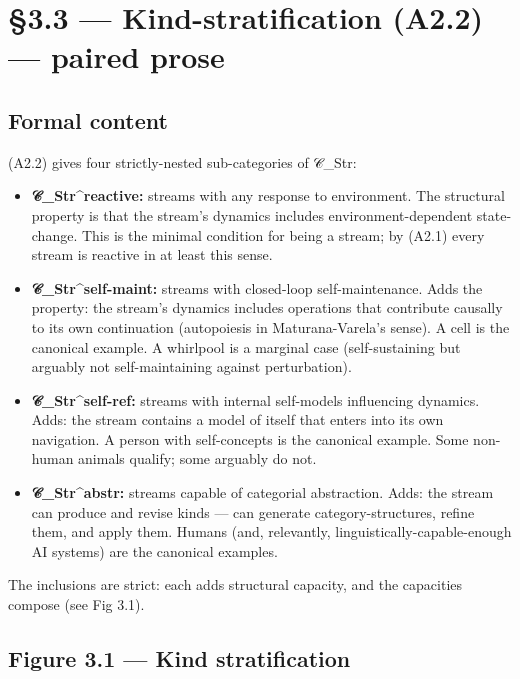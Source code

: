 \documentclass[11pt, openany]{book}
\newcommand{\sectionbreak}{\clearpage}
\begin{document}
\sectionbreak

\section{§3.3 --- Kind-stratification (A2.2) --- paired prose}

\subsection{Formal content}

(A2.2) gives four strictly-nested sub-categories of 𝒞\_\allowbreak{}Str:

\begin{itemize}
\item \textbf{𝒞\_\allowbreak{}Str\textasciicircum{}reactive:} streams with any response to environment. The structural property is that the stream's dynamics includes environment-dependent state-change. This is the minimal condition for being a stream; by (A2.1) every stream is reactive in at least this sense.
\item \textbf{𝒞\_\allowbreak{}Str\textasciicircum{}self-maint:} streams with closed-loop self-maintenance. Adds the property: the stream's dynamics includes operations that contribute causally to its own continuation (autopoiesis in Maturana-Varela's sense). A cell is the canonical example. A whirlpool is a marginal case (self-sustaining but arguably not self-maintaining against perturbation).
\item \textbf{𝒞\_\allowbreak{}Str\textasciicircum{}self-ref:} streams with internal self-models influencing dynamics. Adds: the stream contains a model of itself that enters into its own navigation. A person with self-concepts is the canonical example. Some non-human animals qualify; some arguably do not.
\item \textbf{𝒞\_\allowbreak{}Str\textasciicircum{}abstr:} streams capable of categorial abstraction. Adds: the stream can produce and revise kinds --- can generate category-structures, refine them, and apply them. Humans (and, relevantly, linguistically-capable-enough AI systems) are the canonical examples.
\end{itemize}

The inclusions are strict: each adds structural capacity, and the capacities compose (see Fig 3.1).

\subsection{Figure 3.1 --- Kind stratification}
\end{document}
